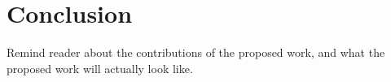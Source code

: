 \section{Conclusion}

Remind reader about the contributions of the proposed work, and what the
proposed work will actually look like.

